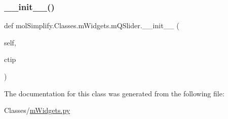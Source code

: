 \subsubsection{\texorpdfstring{\+\_\+\+\_\+init\+\_\+\+\_\+()}{\_\_init\_\_()}}
{\footnotesize\ttfamily def mol\+Simplify.\+Classes.\+m\+Widgets.\+m\+Q\+Slider.\+\_\+\+\_\+init\+\_\+\+\_\+ (\begin{DoxyParamCaption}\item[{}]{self,  }\item[{}]{ctip }\end{DoxyParamCaption})}



The documentation for this class was generated from the following file\+:\begin{DoxyCompactItemize}
\item 
Classes/\hyperlink{mWidgets_8py}{m\+Widgets.\+py}\end{DoxyCompactItemize}
